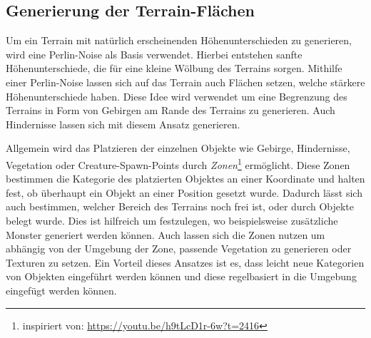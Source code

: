 \subsection{Generierung der Terrain-Flächen}
Um ein Terrain mit natürlich erscheinenden Höhenunterschieden zu generieren, wird eine Perlin-Noise als Basis verwendet.
Hierbei entstehen sanfte Höhenunterschiede, die für eine kleine Wölbung des Terrains sorgen.
Mithilfe einer Perlin-Noise lassen sich auf das Terrain auch Flächen setzen, welche stärkere Höhenunterschiede haben.
Diese Idee wird verwendet um eine Begrenzung des Terrains in Form von Gebirgen am Rande des Terrains zu generieren.
Auch Hindernisse lassen sich mit diesem Ansatz generieren.

Allgemein wird das Platzieren der einzelnen Objekte wie Gebirge, Hindernisse, Vegetation oder Creature-Spawn-Points durch \emph{Zonen}\footnote{inspiriert von: \url{https://youtu.be/h9tLcD1r-6w?t=2416}} ermöglicht.
Diese Zonen bestimmen die Kategorie des platzierten Objektes an einer Koordinate und halten fest, ob überhaupt ein Objekt an einer Position gesetzt wurde.
Dadurch lässt sich auch bestimmen, welcher Bereich des Terrains noch frei ist, oder durch Objekte belegt wurde.
Dies ist hilfreich um festzulegen, wo beispielsweise zusätzliche Monster generiert werden können.
Auch lassen sich die Zonen nutzen um abhängig von der Umgebung der Zone, passende Vegetation zu generieren oder Texturen zu setzen.
Ein Vorteil dieses Ansatzes ist es, dass leicht neue Kategorien von Objekten eingeführt werden können und diese regelbasiert in die Umgebung eingefügt werden können.